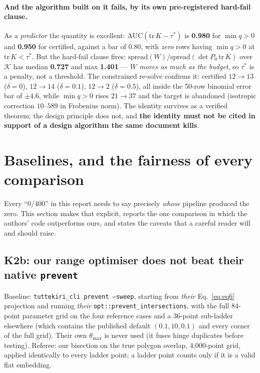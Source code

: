 \documentclass[11pt,a4paper]{article}
\theoremstyle{definition}
\newcommand{\file}[1]{\texttt{\small #1}}
\begin{document}
\paragraph{And the algorithm built on it fails, by its own pre-registered hard-fail clause.}
As a \emph{predictor} the quantity is excellent: AUC$(\mathrm{tr}\,K-\tau^*)$ is
\textbf{0.980} for $\min q>0$ and \textbf{0.950} for certified, against a bar of 0.80, with
\emph{zero} rows having $\min q>0$ at $\mathrm{tr}\,K<\tau^*$. But the hard-fail clause fires:
$\mathrm{spread}(W)/\mathrm{spread}(\det P_0\,\mathrm{tr}\,K)$ over $\mathcal{K}$ has median
\textbf{0.727} and max \textbf{1.401} --- \emph{$W$ moves as much as the budget}, so $\tau^*$
is a penalty, not a threshold. The constrained re-solve confirms it: certified
$12\to13$ ($\delta=0$), $12\to14$ ($\delta=0.1$), $12\to2$ ($\delta=0.5$), all inside the
50-row binomial error bar of $\pm4.6$, while $\min q>0$ rises $21\to37$ and the target is
abandoned (isotropic correction $10$--$589$ in Frobenius norm). The identity survives as a
verified theorem; the design principle does not, and \textbf{the identity must not be cited in
support of a design algorithm the same document kills}.

\clearpage
\section{Baselines, and the fairness of every comparison}
\label{sec:baselines}

Every ``0/400'' in this report needs to say precisely \emph{whose} pipeline produced the
zero. This section makes that explicit, reports the one comparison in which the authors' code
outperforms ours, and states the caveats that a careful reader will and should raise.

\subsection{K2b: our range optimiser does not beat their native \texttt{prevent}}

Baseline: \file{tuttekiri\_cli prevent --sweep}, starting from \emph{their} Eq.~\eqref{eq:eq6}
projection and running \emph{their} \file{opt::prevent\_intersections}, with the full 84-point
parameter grid on the four reference cases and a 36-point sub-ladder elsewhere (which contains
the published default $(0.1,10,0.1)$ and every corner of the full grid). Their own
$\theta_{\max}$ is never used (it fuses hinge duplicates before testing). Referee: our
bisection on the true polygon overlap, 4{,}000-point grid, applied identically to every ladder
point; a ladder point counts only if it is a valid flat embedding.
\end{document}
